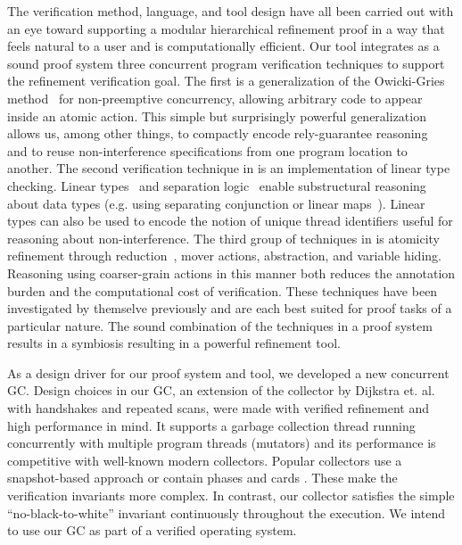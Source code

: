 The verification method, language, and tool design have all been carried out with an eye toward supporting a modular hierarchical refinement proof in a way that feels natural to a user and is computationally efficient. 
Our tool integrates as a sound proof system three concurrent program verification techniques to support the refinement verification goal. 
The first \civl is a generalization of the Owicki-Gries method~\cite{OwickiG76} for non-preemptive concurrency, 
allowing arbitrary code to appear inside an atomic action. 
This simple but surprisingly powerful generalization allows us, among other things, to compactly encode rely-guarantee reasoning~\cite{Jones83}
and to reuse non-interference specifications from one program location to another.
The second verification technique in \civl is an implementation of linear type checking.
Linear types~\cite{Wadler90lineartypes} and separation logic~\cite{Reynolds02} enable substructural reasoning about data types
(e.g. using separating conjunction or linear maps~\cite{LahiriQW11}).
Linear types can also be used to encode the notion of unique thread identifiers useful for reasoning about non-interference. 
The third group of techniques in \civl is atomicity refinement through reduction~\cite{Lipton}, mover actions, abstraction, and variable hiding.
Reasoning using coarser-grain actions in this manner both reduces the annotation burden and the computational cost of verification. 
These techniques have been investigated by themselve previously and are each best suited for proof tasks of a particular nature. 
The sound combination of the techniques in a proof system results in a symbiosis resulting in a powerful refinement tool. 

As a design driver for our proof system and tool, we developed a new concurrent GC. 
Design choices in our GC, an extension of the collector by Dijkstra et. al. \cite{dijk78}  with handshakes \cite{doli93,doli94} and repeated scans, were made with verified refinement and high performance in mind. 
It supports a garbage collection thread running concurrently with multiple program threads (mutators) and its performance is competitive with well-known modern collectors. 
Popular collectors use a snapshot-based approach \cite{doli93,doli94,doma00,azat03} or contain phases and cards \cite{boeh91,prin00a,bara05}. These make the verification invariants more complex. In contrast, 
our collector satisfies the simple ``no-black-to-white'' invariant continuously throughout the execution. We intend to use our GC as part of a verified operating system. 


